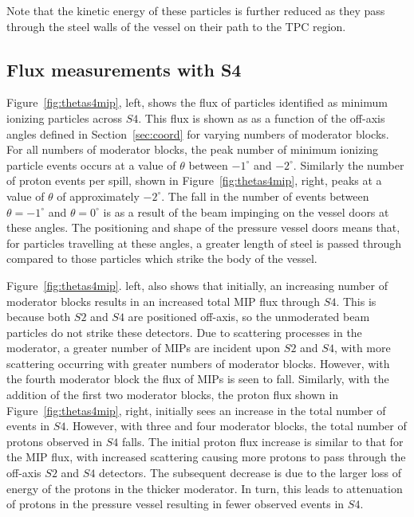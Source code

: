 Note that the kinetic energy of these particles is further reduced as they pass through the steel walls of the vessel on their path to the TPC region.

\subsection{Flux measurements with S4}

Figure~\ref{fig:thetas4mip}, left, shows the flux of particles identified as minimum ionizing particles across $\mathit{S4}$.
This flux is shown as as a function of the off-axis angles defined in Section~\ref{sec:coord} for varying numbers of moderator blocks.
For all numbers of moderator blocks, the peak number of minimum ionizing particle events occurs at a value of $\theta$ between $-1^{\circ}$ and $-2^{\circ}$.
Similarly the number of proton events per spill, shown in Figure~\ref{fig:thetas4mip}, right, peaks at a value of $\theta$ of approximately $-2^{\circ}$.
The fall in the number of events between $\theta = -1^{\circ}$ and $\theta = 0^{\circ}$ is as a result of the beam impinging on the vessel doors at these angles.
The positioning and shape of the pressure vessel doors means that, for particles travelling at these angles, a greater length of steel is passed through compared to those particles which strike the body of the vessel.


Figure~\ref{fig:thetas4mip}. left, also shows that initially, an increasing number of moderator blocks results in an increased total MIP flux through $\mathit{S4}$. 
This is because both $\mathit{S2}$ and $\mathit{S4}$ are positioned off-axis, so the unmoderated beam particles do not strike these detectors.
Due to scattering processes in the moderator, a greater number of MIPs are incident upon $\mathit{S2}$ and $\mathit{S4}$, with more scattering occurring with greater numbers of moderator blocks.
However, with the fourth moderator block the flux of MIPs is seen to fall.
Similarly, with the addition of the first two moderator blocks, the proton flux shown in Figure~\ref{fig:thetas4mip}, right, initially sees an increase in the total number of events in $\mathit{S4}$.
However, with three and four moderator blocks, the total number of protons observed in $\mathit{S4}$ falls.
The initial proton flux increase is similar to that for the MIP flux, with increased scattering causing more protons to pass through the off-axis $\mathit{S2}$ and $\mathit{S4}$ detectors.
The subsequent decrease is due to the larger loss of energy of the protons in the thicker moderator.
In turn, this leads to attenuation of protons in the pressure vessel resulting in fewer observed events in $\mathit{S4}$.


